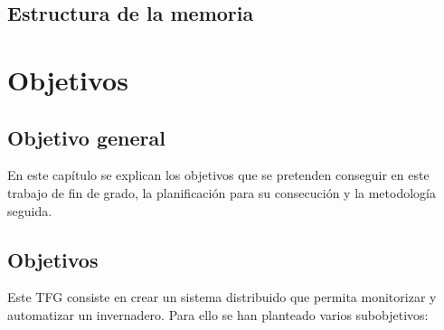 \documentclass[a4paper, 12pt, oneside]{book}
\begin{document}
\section{Estructura de la memoria}
\label{sec:estructura}

%
%
%  
%  
%  

\cleardoublepage %
\chapter{Objetivos} %
\label{chap:objetivos} %

\section{Objetivo general} %
\label{sec:objetivo-general} %
En este capítulo se explican los objetivos que se pretenden conseguir en este trabajo de fin de grado, la planificación para su consecución y la metodología seguida.


\section{Objetivos}
\label{sec:objetivos}

Este TFG consiste en crear un sistema distribuido que permita monitorizar y automatizar un invernadero. Para ello se han planteado varios subobjetivos:
\end{document}
